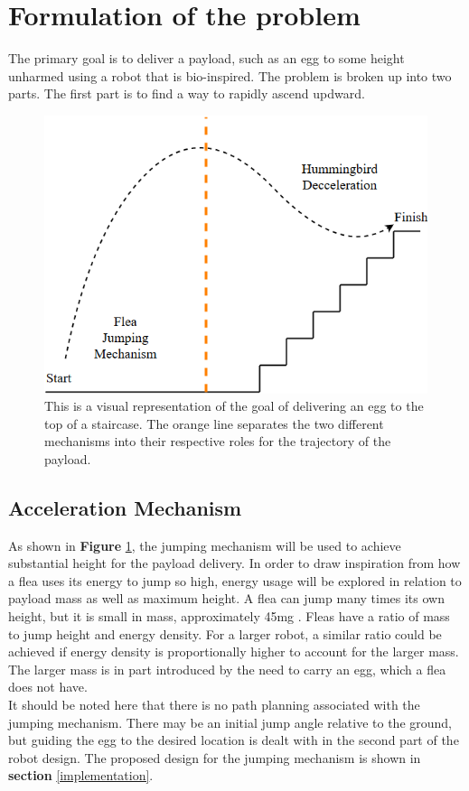 \section{Formulation of the problem}
\label{Formulation}

\indent The primary goal is to deliver a payload, such as an egg to some height unharmed using a robot that is bio-inspired. The problem is broken up into two parts. The first part is to find a way to rapidly ascend updward.\\

\begin{figure}[H]
\begin{center}
\includegraphics[width=0.75\linewidth]{./Figures/trajectory.png}
\caption{This is a visual representation of the goal of delivering an egg to the top of a staircase. The orange line separates the two different mechanisms into their respective roles for the trajectory of the payload.}
\label{fig:trajectory}
\end{center}
\end{figure}

\subsection{Acceleration Mechanism}
\indent As shown in \textbf{Figure} \ref{fig:trajectory}, the jumping mechanism will be used to achieve substantial height for the payload delivery. In order to draw inspiration from how a flea uses its energy to jump so high, energy usage will be explored in relation to payload mass as well as maximum height. A flea can jump many times its own height, but it is small in mass, approximately 45mg \cite[p.~63]{bennet-clark_jump_nodate}. Fleas have a ratio of mass to jump height and energy density. For a larger robot, a similar ratio could be achieved if energy density is proportionally higher to account for the larger mass. The larger mass is in part introduced by the need to carry an egg, which a flea does not have.\\
\indent It should be noted here that there is no path planning associated with the jumping mechanism. There may be an initial jump angle relative to the ground, but guiding the egg to the desired location is dealt with in the second part of the robot design. The proposed design for the jumping mechanism is shown in \textbf{section} \ref{implementation}.\\

